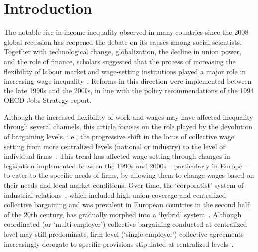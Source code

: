 \documentclass[Review,times,sageh,11pt]{sagej}
\begin{document}
\raggedright
\frenchspacing

\section*{Introduction}
\label{sec:intro}
The notable rise in income inequality observed in many countries since the 2008 global recession has reopened the debate on its causes among social scientists. 
Together with technological change, globalization, the decline in union power, and the role of finance, scholars suggested that the process of increasing the flexibility of labour market and wage-setting institutions played a major role in increasing wage inequality~\citep{cobb2016}. Reforms in this direction were implemented between the late 1990s and the 2000s, in line with the policy recommendations of the 1994 OECD Jobs Strategy report.

Although the increased flexibility of work and wages may have affected inequality through several channels, this article focuses on the role played by the devolution of bargaining levels, i.e., the progressive shift in the locus of collective wage setting from more centralized levels (national or industry) to the level of individual firms~\citep{undy1978}. This trend has affected wage-setting through changes in legislation implemented between the 1990s and 2000s -- particularly in Europe -- to cater to the specific needs of firms, by allowing them to change wages based on their needs and local market conditions.
Over time, the ‘corporatist’ system of industrial relations~\citep{wallerstein1997unions}, which included high union coverage and centralized collective bargaining and was prevalent in European countries in the second half of the 20th century, has gradually morphed into a ‘hybrid’ system~\citep{Braakmann}. 
Although coordinated (or ‘multi-employer’) collective bargaining conducted at centralized level may still predominate, firm-level (‘single-employer’)  collective agreements increasingly derogate to specific provisions stipulated at centralized levels~\citep{visser2013wage}.
\end{document}
